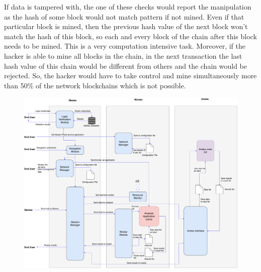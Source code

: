 \documentclass[10pt,journal,compsoc]{IEEEtran}
\begin{document}
If data is tampered with, the one of these checks would report the manipulation as the hash of some block would not match pattern if not mined. Even if that particular block is mined, then the previous hash value of the next block won’t match the hash of this block, so each and every block of the chain after this block needs to be mined. This is a very computation intensive task. Moreover, if the hacker is able to mine all blocks in the chain, in the next transaction the last hash value of this chain would be different from others and the chain would be rejected. So, the hacker would have to take control and mine simultaneously more than 50\% of the network blockchains which is not possible.

\begin{figure}[h]
\centering
\includegraphics[width=18cm]{working}
\end{figure}
\end{document}
